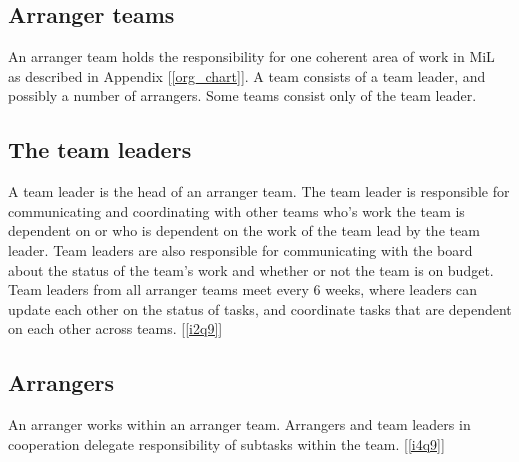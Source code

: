 \subsection{Arranger teams} %
\label{sub:arranger_team}
An arranger team holds the responsibility for one coherent area of work in MiL as described in
Appendix [\ref{org_chart}]. A team consists of a team leader, and possibly a number of arrangers. Some teams consist only of the team leader.

\subsection{The team leaders}
\label{sub:team_leaders}
A team leader is the head of an arranger team. The team leader is responsible for communicating and coordinating with other teams who's work the team is dependent on or who is dependent on the work of the team lead by the team leader. Team leaders are also responsible for communicating with the board about the status of the team's work and whether or not the team is on budget. Team leaders from all arranger teams meet every 6 weeks, where leaders can update each other on the status of tasks, and coordinate tasks that are dependent on each other across teams. [\ref{i2q9}]

\subsection{Arrangers}
\label{sub:team_members}
An arranger works within an arranger team. Arrangers and team leaders in cooperation delegate responsibility of subtasks within the team. [\ref{i4q9}]

